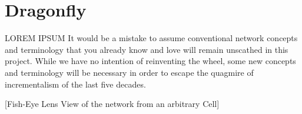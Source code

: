 \documentclass[../../../OAE-SPEC-MAIN.tex]{subfiles}
\begin{document}
\section{Dragonfly}

LOREM IPSUM It would be a mistake to assume conventional network concepts and terminology that you already know and love will remain unscathed in this project. While we have no intention of reinventing the wheel,  some new concepts and terminology will be necessary in order to escape the quagmire of incrementalism of the last five decades.  

[Fish-Eye Lens View of the network from an arbitrary Cell]
      \vspace{2em}
\end{document}
